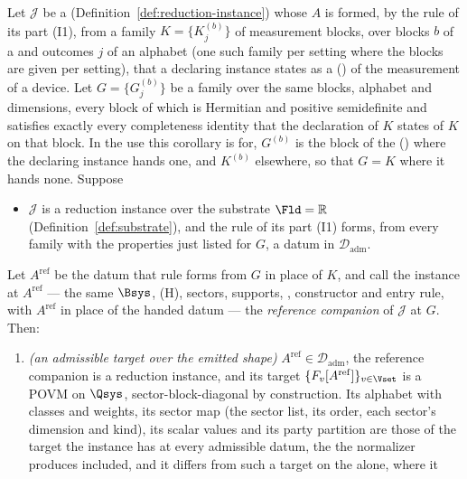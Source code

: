\begin{corollary}\label{cor:reference-companion}
Let $\mathcal{J}$ be a 
(Definition~\ref{def:reduction-instance}) whose  $A$ is
formed, by the rule of its part (I1), from a family $K=\{K^{(b)}_j\}$ of
measurement blocks, over blocks $b$ of a  and outcomes $j$ of an
alphabet (one such family per setting where the blocks are given per
setting), that a declaring instance states as a 
() of the measurement of a device. Let
$G=\{G^{(b)}_j\}$ be a family over the same blocks, alphabet and dimensions,
every block of which is Hermitian and positive semidefinite and satisfies
exactly every completeness identity that the declaration of $K$ states of
$K$ on that block. In the use this corollary is for, $G^{(b)}$ is the block
of the  ()
where the declaring instance hands one, and $K^{(b)}$ elsewhere, so that
$G=K$ where it hands none. Suppose
\begin{itemize}[leftmargin=4.2em]
\item[(H-REF)] $\mathcal{J}$ is a reduction instance over the substrate
  $\Fld=\mathbb{R}$ (Definition~\ref{def:substrate}), and the rule of its
  part (I1) forms, from every family with the properties just listed for $G$,
  a datum in $\mathcal{D}_{\mathrm{adm}}$.
\end{itemize}
Let $A^{\mathrm{ref}}$ be the datum that rule forms from $G$ in place of
$K$, and call the instance at $A^{\mathrm{ref}}$ --- the same $\Bsys$, (H),
sectors, supports, , constructor and entry rule, with
$A^{\mathrm{ref}}$ in place of the handed datum --- the
\emph{reference companion} of $\mathcal{J}$ at $G$. Then:
\begin{enumerate}[label=(\roman*),leftmargin=3.0em]
\item \emph{(an admissible target over the emitted shape)}
  $A^{\mathrm{ref}}\in\mathcal{D}_{\mathrm{adm}}$, the reference companion
  is a reduction instance, and its target $\{F_v[A^{\mathrm{ref}}]\}_{v\in\Vset}$
  is a POVM on $\Qsys$, sector-block-diagonal by construction. Its alphabet
  with classes and weights, its sector map (the sector list, its order, each
  sector's dimension and kind), its scalar values and its party partition are
  those of the target the instance has at every admissible datum, the
   the normalizer produces included, and it differs
  from such a target on the  alone, where it

\end{enumerate}
\end{corollary}
